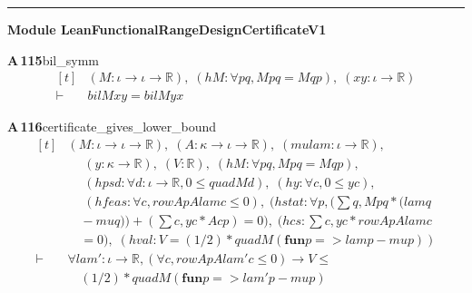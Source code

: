 \documentclass[conference]{IEEEtran}
\theoremstyle{definition}
\newcommand{\lean}[1]{\textsf{\footnotesize #1}}
\begin{document}
\vspace{4pt}\noindent\rule{\columnwidth}{0.4pt}\par\vspace{2pt}
\noindent\textbf{Module \lean{LeanFunctionalRangeDesignCertificateV1}}\par\vspace{3pt}

\noindent\textbf{A\,115}\quad\lean{bil\_symm}
{\footnotesize\[ \begin{aligned}[t]
&(\mathit{M} : \iota \to \iota \to \mathbb{R} ),\; (\mathit{hM} : \forall \mathit{p} \mathit{q}, \mathit{M} \mathit{p} \mathit{q} = \mathit{M} \mathit{q} \mathit{p}),\; (\mathit{x} \mathit{y} : \iota \to \mathbb{R} )\\
\vdash\;&\mathit{bil} \mathit{M} \mathit{x} \mathit{y} = \mathit{bil} \mathit{M} \mathit{y} \mathit{x}
\end{aligned} \]}

\noindent\textbf{A\,116}\quad\lean{certificate\_gives\_lower\_bound}
{\footnotesize\[ \begin{aligned}[t]
&(\mathit{M} : \iota \to \iota \to \mathbb{R} ),\; (\mathit{A} : \kappa \to \iota \to \mathbb{R} ),\; (\mathit{mu} \mathit{lam} : \iota \to \mathbb{R} ),\\
&\quad \; (\mathit{y} : \kappa \to \mathbb{R} ),\; (\mathit{V} : \mathbb{R} ),\; (\mathit{hM} : \forall \mathit{p} \mathit{q}, \mathit{M} \mathit{p} \mathit{q} = \mathit{M} \mathit{q} \mathit{p}),\\
&\quad \; (\mathit{hpsd} : \forall \mathit{d} : \iota \to \mathbb{R} , 0 \leq \mathit{quad} \mathit{M} \mathit{d}),\; (\mathit{hy} : \forall \mathit{c}, 0 \leq \mathit{y} \mathit{c}),\\
&\quad \; (\mathit{hfeas} : \forall \mathit{c}, \mathit{rowAp} \mathit{A} \mathit{lam} \mathit{c} \leq 0),\; (\mathit{hstat} : \forall \mathit{p}, (\textstyle\sum \mathit{q}, \mathit{M} \mathit{p} \mathit{q} * (\mathit{lam} \mathit{q}\\
&\quad - \mathit{mu} \mathit{q})) + (\textstyle\sum \mathit{c}, \mathit{y} \mathit{c} * \mathit{A} \mathit{c} \mathit{p}) = 0),\; (\mathit{hcs} : \textstyle\sum \mathit{c}, \mathit{y} \mathit{c} * \mathit{rowAp} \mathit{A} \mathit{lam} \mathit{c}\\
&\quad = 0),\; (\mathit{hval} : \mathit{V} = (1/2) * \mathit{quad} \mathit{M} (\mathbf{fun} \mathit{p} => \mathit{lam} \mathit{p} - \mathit{mu} \mathit{p}))\\
\vdash\;&\forall \mathit{lam'} : \iota \to \mathbb{R} , (\forall \mathit{c}, \mathit{rowAp} \mathit{A} \mathit{lam'} \mathit{c} \leq 0) \to \mathit{V} \leq\\
&\quad (1/2) * \mathit{quad} \mathit{M} (\mathbf{fun} \mathit{p} => \mathit{lam'} \mathit{p} - \mathit{mu} \mathit{p})
\end{aligned} \]}
\end{document}
